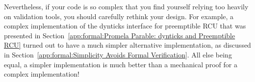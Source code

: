 Nevertheless, if your code is so complex that you find yourself
relying too heavily on validation
tools, you should carefully rethink your design.
For example, a complex implementation of the dynticks interface for
preemptible RCU that was presented in
Section~\ref{app:formal:Promela Parable: dynticks and Preemptible RCU}
turned out to
have a much simpler alternative implementation, as discussed in
Section~\ref{app:formal:Simplicity Avoids Formal Verification}.
All else being equal, a simpler implementation is much better than
a mechanical proof for a complex implementation!
